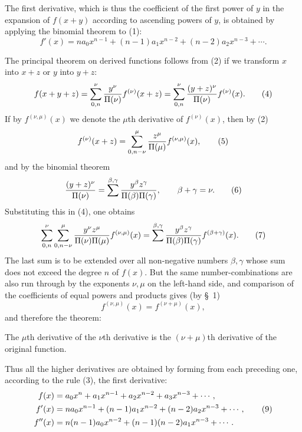 \documentclass[11pt]{article}
\begin{document}
The first derivative, which is thus the coefficient of the first power of $y$ in the expansion of $f(x+y)$ according to ascending powers of $y$, is obtained by applying the binomial theorem to (1):
\begin{equation}
 f'(x)=na_0x^{n-1}+(n-1)a_1x^{n-2}+(n-2)a_2x^{n-3}+\cdots .
\tag{3}
\end{equation}

The principal theorem on derived functions follows from (2) if we transform $x$ into $x+z$ or $y$ into $y+z$:
\begin{equation}
 f(x+y+z)=\sum_{0,n}^{\nu}{y^\nu\over\Pi(\nu)}f^{(\nu)}(x+z)
 =\sum_{0,n}^{\nu}{(y+z)^\nu\over\Pi(\nu)}f^{(\nu)}(x).
\tag{4}
\end{equation}
If by $f^{(\nu,\mu)}(x)$ we denote the $\mu$th derivative of $f^{(\nu)}(x)$, then by (2)
\begin{equation}
 f^{(\nu)}(x+z)=\sum_{0,n-\nu}^{\mu}{z^\mu\over\Pi(\mu)}f^{(\nu,\mu)}(x),
\tag{5}
\end{equation}
and by the binomial theorem
\begin{equation}
 { (y+z)^\nu\over\Pi(\nu)}
 =\sum^{\beta,\gamma}{y^\beta z^\gamma\over\Pi(\beta)\Pi(\gamma)},
 \qquad \beta+\gamma=\nu.
\tag{6}
\end{equation}
Substituting this in (4), one obtains
\begin{equation}
 \sum_{0,n}^{\nu}\sum_{0,n-\nu}^{\mu}
 {y^\nu z^\mu\over\Pi(\nu)\Pi(\mu)}f^{(\nu,\mu)}(x)
 =
 \sum^{\beta,\gamma}
 {y^\beta z^\gamma\over\Pi(\beta)\Pi(\gamma)}f^{(\beta+\gamma)}(x).
\tag{7}
\end{equation}
The last sum is to be extended over all non-negative numbers $\beta,\gamma$ whose sum does not exceed the degree $n$ of $f(x)$. But the same number-combinations are also run through by the exponents $\nu,\mu$ on the left-hand side, and comparison of the coefficients of equal powers and products gives (by \S~1)
\begin{equation}
 f^{(\nu,\mu)}(x)=f^{(\nu+\mu)}(x),
\tag{8}
\end{equation}
and therefore the theorem:

The $\mu$th derivative of the $\nu$th derivative is the $(\nu+\mu)$th derivative of the original function.

Thus all the higher derivatives are obtained by forming from each preceding one, according to the rule (3), the first derivative:
\begin{align}
 f(x)&=a_0x^n+a_1x^{n-1}+a_2x^{n-2}+a_3x^{n-3}+\cdots,\notag\\
 f'(x)&=na_0x^{n-1}+(n-1)a_1x^{n-2}+(n-2)a_2x^{n-3}+\cdots, \tag{9}\\
 f''(x)&=n(n-1)a_0x^{n-2}+(n-1)(n-2)a_1x^{n-3}+\cdots. \notag
\end{align}
\end{document}

